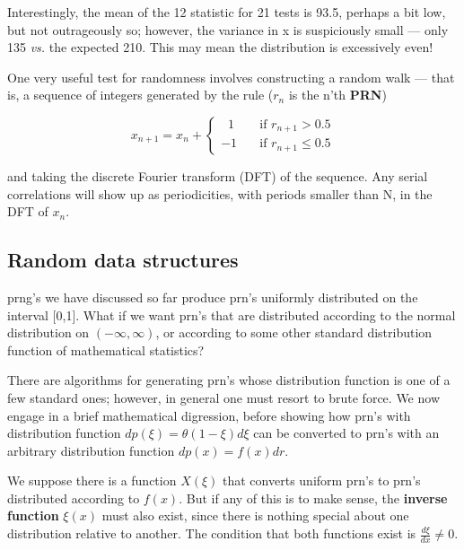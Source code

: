 \begin{lstlisting}
\end{lstlisting} 
 
Interestingly, the mean of the 12 statistic for 21 tests is 93.5,
perhaps a bit low, but not outrageously so; however, the variance
in x is suspiciously small — only 135 \textit{vs.} the expected 210. This
may mean the distribution is excessively even!

One very useful test for randomness involves constructing a
random walk — that is, a sequence of integers generated by the
rule ($r_n$ is the n'th \textbf{PRN})

\begin{equation}
x_{n+1}=x_n+
\begin{cases}
    \;\; 1 & \quad \text{if } r_{n+1} > 0.5 \\
    -1 & \quad \text{if }  r_{n+1} \leq 0.5
    \end{cases}
\end{equation}

and taking the discrete Fourier transform (DFT) of the sequence.
Any serial correlations will show up as periodicities,
with periods smaller than N, in the DFT of $x_n$.

\subsection{Random data structures}
 prng's we have discussed so far produce prn's uniformly distributed
on the interval [0,1]. What if we want prn's that are
distributed according to the normal distribution on $(-\infty,\infty)$, or
according to some other standard distribution function of mathematical statistics?

There are algorithms for generating prn's whose distribution
function is one of a few standard ones; however, in general one
must resort to brute force. We now engage in a brief mathematical
digression, before showing how prn's with distribution function
$dp(\xi) = \theta(1 - \xi)d\xi$ can be converted to prn's with an arbitrary
distribution function $dp(x) =f(x)dr$.

We suppose there is a function $X(\xi)$ that converts uniform prn's
to prn's distributed according to $f(x)$. But if any of this is to make
sense, the \textbf{inverse function} $\xi(x)$ must also exist, since there is
nothing special about one distribution relative to another. The
condition that both functions exist is $\frac{d\xi}{dx}\neq 0$.

